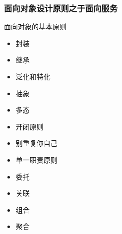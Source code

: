 \subsubsection{面向对象设计原则之于面向服务}
面向对象的基本原则
\vspace{-0.8em}
\begin{multicols}{4}
    \begin{spacing}{1.1}
        \begin{itemize}
            \item 封装
            \item 继承
            \item 泛化和特化
            \item 抽象
            \item 多态
            \item 开闭原则
            \item 别重复你自己
            \item 单一职责原则
            \item 委托
            \item 关联
            \item 组合
            \item 聚合
        \end{itemize}
    \end{spacing}
\end{multicols}
\vspace{-1em}

